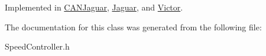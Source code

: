 Implemented in \hyperlink{classCANJaguar_aa8a4f32b3c1839557cd73996693a116a}{CANJaguar}, \hyperlink{classJaguar_a1a15089e9ea94102f1d003bce3ae2f54}{Jaguar}, and \hyperlink{classVictor_aabd64f11a67851b3a4eed9b2ea1016ca}{Victor}.



The documentation for this class was generated from the following file:\begin{DoxyCompactItemize}
\item 
SpeedController.h\end{DoxyCompactItemize}
